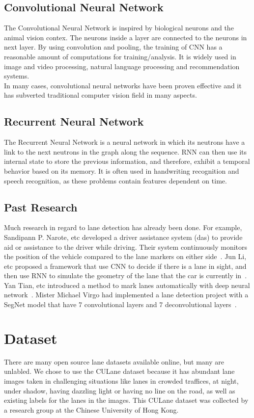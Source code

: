 \documentclass[runningheads]{llncs}
\begin{document}
\subsection{Convolutional Neural Network}
The Convolutional Neural Network is inspired by biological neurons and the animal vision contex. The neurons inside a layer are connected to the neurons in next layer. By using convolution and pooling, the training of CNN has a reasonable amount of computations for training/analysis. It is widely used in image and video processing,  natural language processing and recommendation systems. \\
In many cases, convolutional neural networks have been proven effective and it has subverted traditional computer vision field in many aspects.

\subsection{Recurrent Neural Network}
The Recurrent Neural Network is a neural network in which its neutrons have a link to the next neutrons in the graph along the sequence. RNN can then use its internal state to store the previous information, and therefore, exhibit a temporal behavior based on its memory. It is often used in handwriting recognition and speech recognition, as these problems contain features dependent on time.

\subsection{Past Research}
Much research in regard to lane detection has already been done. For example, Sandipann P. Narote, etc developed a driver assistance system (das) to provide aid or assistance to the driver while driving. Their system continuously monitors the position of the vehicle compared to the lane markers on either side~\cite{ref:3}. Jun Li, etc proposed a framework that use CNN to decide if there is a lane in sight, and then use RNN to simulate the geometry of the lane that the car is currently in~\cite{ref:4}. Yan Tian, etc introduced a method to mark lanes automatically with deep neural network~\cite{ref:5}. Mister Michael Virgo had implemented a lane detection project with a SegNet model that have 7 convolutional layers and 7 deconvolutional layers~\cite{ref:6}.

\section{Dataset}
There are many open source lane datasets available online, but many are unlabled. We chose to use the CULane dataset because it has abundant lane images taken in challenging situations like lanes in crowded traffices, at night, under shadow, having dazzling light or having no line on the road, as well as existing labels for the lanes in the images. This CULane dataset was collected by a research group at the Chinese University of Hong Kong.
\end{document}
